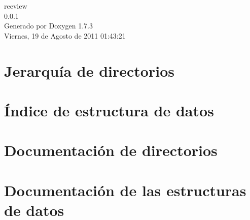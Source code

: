 \documentclass[a4paper]{book}
\begin{document}
\hypersetup{pageanchor=false}
\begin{titlepage}
\vspace*{7cm}
\begin{center}
{\Large reeview \\[1ex]\large 0.0.1 }\\
\vspace*{1cm}
{\large Generado por Doxygen 1.7.3}\\
\vspace*{0.5cm}
{\small Viernes, 19 de Agosto de 2011 01:43:21}\\
\end{center}
\end{titlepage}
\clearemptydoublepage
{}
\tableofcontents
\clearemptydoublepage
{}
\hypersetup{pageanchor=true}
\chapter{Jerarquía de directorios}

\chapter{Índice de estructura de datos}

\chapter{Documentación de directorios}

\chapter{Documentación de las estructuras de datos}



\printindex
\end{document}
